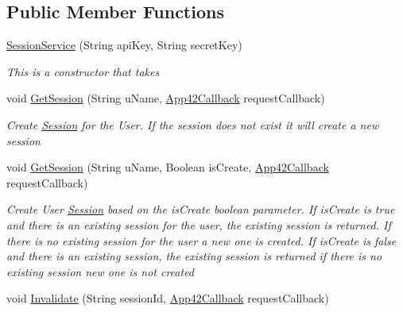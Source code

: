 \subsection*{Public Member Functions}
\begin{DoxyCompactItemize}
\item 
\hyperlink{classcom_1_1shephertz_1_1app42_1_1paas_1_1sdk_1_1windows_1_1session_1_1_session_service_add0eee60e2206dc5685bac82a480f269}{Session\+Service} (String api\+Key, String secret\+Key)
\begin{DoxyCompactList}\small\item\em This is a constructor that takes \end{DoxyCompactList}\item 
void \hyperlink{classcom_1_1shephertz_1_1app42_1_1paas_1_1sdk_1_1windows_1_1session_1_1_session_service_ad04b4816770aa70bab95d1a2ea1d9530}{Get\+Session} (String u\+Name, \hyperlink{interfacecom_1_1shephertz_1_1app42_1_1paas_1_1sdk_1_1windows_1_1_app42_callback}{App42\+Callback} request\+Callback)
\begin{DoxyCompactList}\small\item\em Create \hyperlink{classcom_1_1shephertz_1_1app42_1_1paas_1_1sdk_1_1windows_1_1session_1_1_session}{Session} for the User. If the session does not exist it will create a new session \end{DoxyCompactList}\item 
void \hyperlink{classcom_1_1shephertz_1_1app42_1_1paas_1_1sdk_1_1windows_1_1session_1_1_session_service_a97cc6553b8e3324372c647f5b0b70688}{Get\+Session} (String u\+Name, Boolean is\+Create, \hyperlink{interfacecom_1_1shephertz_1_1app42_1_1paas_1_1sdk_1_1windows_1_1_app42_callback}{App42\+Callback} request\+Callback)
\begin{DoxyCompactList}\small\item\em Create User \hyperlink{classcom_1_1shephertz_1_1app42_1_1paas_1_1sdk_1_1windows_1_1session_1_1_session}{Session} based on the is\+Create boolean parameter. If is\+Create is true and there is an existing session for the user, the existing session is returned. If there is no existing session for the user a new one is created. If is\+Create is false and there is an existing session, the existing session is returned if there is no existing session new one is not created \end{DoxyCompactList}\item 
void \hyperlink{classcom_1_1shephertz_1_1app42_1_1paas_1_1sdk_1_1windows_1_1session_1_1_session_service_ae0c49c221130c2fe7ec01994848be52d}{Invalidate} (String session\+Id, \hyperlink{interfacecom_1_1shephertz_1_1app42_1_1paas_1_1sdk_1_1windows_1_1_app42_callback}{App42\+Callback} request\+Callback)

\end{DoxyCompactItemize}
